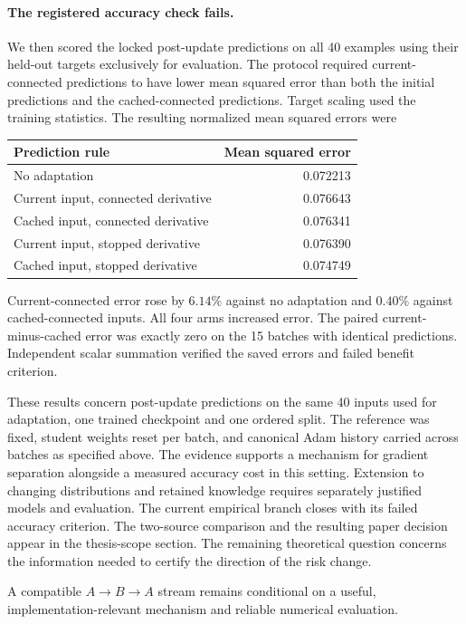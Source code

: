 \documentclass[11pt,a4paper]{article}
\begin{document}
\paragraph{The registered accuracy check fails.}
We then scored the locked post-update predictions on all 40 examples
using their held-out targets exclusively for evaluation. The protocol
required current-connected predictions to have lower mean squared error
than both the initial predictions and the cached-connected predictions.
Target scaling used the training statistics. The resulting normalized
mean squared errors were
\begin{center}
\begin{tabular}{lr}
\hline
Prediction rule & Mean squared error\\
\hline
No adaptation & 0.072213\\
Current input, connected derivative & 0.076643\\
Cached input, connected derivative & 0.076341\\
Current input, stopped derivative & 0.076390\\
Cached input, stopped derivative & 0.074749\\
\hline
\end{tabular}
\end{center}
Current-connected error rose by $6.14\%$ against no adaptation and
$0.40\%$ against cached-connected inputs. All four arms increased error.
The paired current-minus-cached error was exactly zero on the 15 batches
with identical predictions. Independent scalar summation verified the
saved errors and failed benefit criterion.

These results concern post-update predictions on the same 40 inputs
used for adaptation, one trained checkpoint and one ordered split.
The reference was fixed, student weights reset per batch, and canonical
Adam history carried across batches as specified above. The evidence
supports a mechanism for gradient separation alongside a measured accuracy
cost in this setting. Extension to changing distributions and retained
knowledge requires separately justified models and evaluation.
The current empirical branch closes with its failed accuracy criterion.
The two-source comparison and the resulting paper decision appear in
the thesis-scope section. The remaining theoretical question concerns
the information needed to certify the direction of the risk change.

A compatible $A\to B\to A$ stream remains conditional on a useful,
implementation-relevant mechanism and reliable numerical evaluation.
\end{document}
